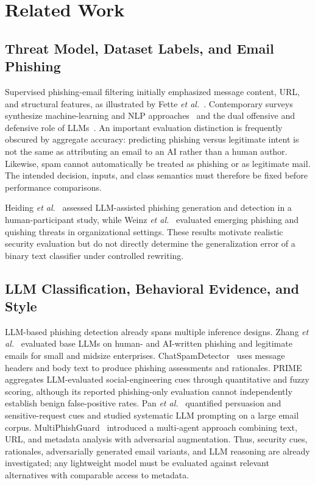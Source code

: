 \section{Related Work}\label{sec:related_work}

\subsection{Threat Model, Dataset Labels, and Email Phishing}
Supervised phishing-email filtering initially emphasized message content, URL, and structural features, as illustrated by Fette \emph{et al.}~\cite{fette2007learning}. Contemporary surveys synthesize machine-learning and NLP approaches~\cite{kavya2025review} and the dual offensive and defensive role of LLMs~\cite{sivaneswaran2026review}. An important evaluation distinction is frequently obscured by aggregate accuracy: predicting phishing versus legitimate intent is not the same as attributing an email to an AI rather than a human author. Likewise, spam cannot automatically be treated as phishing or as legitimate mail. The intended decision, inputs, and class semantics must therefore be fixed before performance comparisons.

Heiding \emph{et al.}~\cite{heiding2024devising} assessed LLM-assisted phishing generation and detection in a human-participant study, while Weinz \emph{et al.}~\cite{weinz2025impact} evaluated emerging phishing and quishing threats in organizational settings. These results motivate realistic security evaluation but do not directly determine the generalization error of a binary text classifier under controlled rewriting.

\subsection{LLM Classification, Behavioral Evidence, and Style}
LLM-based phishing detection already spans multiple inference designs. Zhang \emph{et al.}~\cite{zhang2025sme} evaluated base LLMs on human- and AI-written phishing and legitimate emails for small and midsize enterprises. ChatSpamDetector~\cite{koide2026chatspamdetector} uses message headers and body text to produce phishing assessments and rationales. PRIME~\cite{tian2025prime} aggregates LLM-evaluated social-engineering cues through quantitative and fuzzy scoring, although its reported phishing-only evaluation cannot independently establish benign false-positive rates. Pan \emph{et al.}~\cite{pan2026psychology} quantified persuasion and sensitive-request cues and studied systematic LLM prompting on a large email corpus. MultiPhishGuard~\cite{xue2025multiphishguard} introduced a multi-agent approach combining text, URL, and metadata analysis with adversarial augmentation. Thus, security cues, rationales, adversarially generated email variants, and LLM reasoning are already investigated; any lightweight model must be evaluated against relevant alternatives with comparable access to metadata.

